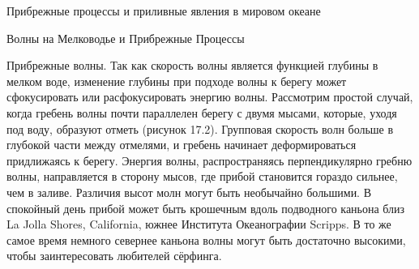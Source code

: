 \begin{chapter}{Прибрежные процессы и приливные явления в мировом океане}
\begin{section}{Волны на Мелководье и Прибрежные Процессы}
\begin{paragraph}{Прибрежные волны.}
Так как скорость волны является функцией глубины в мелком воде,
изменение глубины при подходе волны к берегу может сфокусировать или
расфокусировать энергию волны. Рассмотрим простой случай, когда
гребень волны почти параллелен берегу с двумя мысами, которые, уходя
под воду, образуют отметь (рисунок 17.2). Групповая скорость волн
больше в глубокой части между отмелями, и гребень начинает
деформироваться придлижаясь к берегу. Энергия волны, распространяясь
перпендикулярно гребню волны, направляется в сторону мысов, где прибой
становится гораздо сильнее, чем в заливе. Различия высот молн могут
быть необычайно большими. В спокойный день прибой может быть крошечным
вдоль подводного каньона близ La Jolla Shores, California, южнее
Института Океанографии Scripps. В то же самое время немного севернее
каньона волны могут быть достаточно высокими, чтобы заинтересовать
любителей сёрфинга.
%
\end{paragraph}


\end{section}
\end{chapter}
